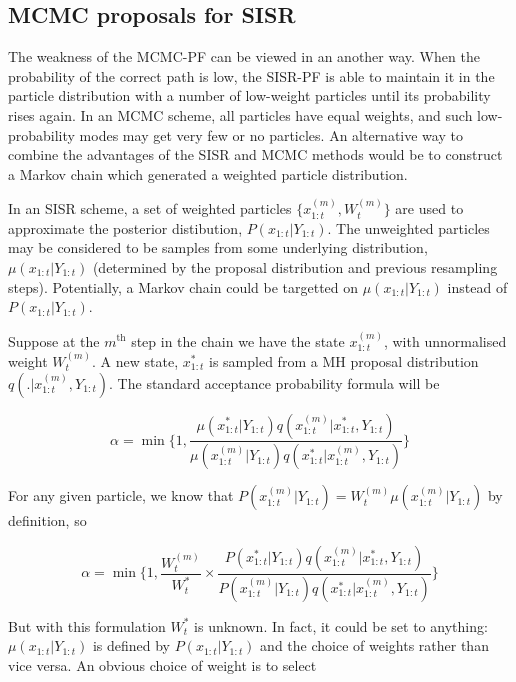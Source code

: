 \subsection{MCMC proposals for SISR}
The weakness of the MCMC-PF can be viewed in an another way. When the probability of the correct path is low, the SISR-PF is able to maintain it in the particle distribution with a number of low-weight particles until its probability rises again. In an MCMC scheme, all particles have equal weights, and such low-probability modes may get very few or no particles. An alternative way to combine the advantages of the SISR and MCMC methods would be to construct a Markov chain which generated a weighted particle distribution.

In an SISR scheme, a set of weighted particles $\{ x_{1:t}^{(m)}, W_t^{(m)} \}$ are used to approximate the posterior distibution, $P(x_{1:t}|Y_{1:t})$. The unweighted particles may be considered to be samples from some underlying distribution, $\mu(x_{1:t}|Y_{1:t})$ (determined by the proposal distribution and previous resampling steps). Potentially, a Markov chain could be targetted on $\mu(x_{1:t}|Y_{1:t})$ instead of $P(x_{1:t}|Y_{1:t})$.

Suppose at the $m^{\text{th}}$ step in the chain we have the state $x_{1:t}^{(m)}$, with unnormalised weight $W_t^{(m)}$. A new state, $x_{1:t}^{*}$ is sampled from a MH proposal distribution $q(.|x_{1:t}^{(m)}, Y_{1:t})$. The standard acceptance probability formula will be

\begin{equation}
\alpha = \min \bigg \{ 1, \frac{\mu(x_{1:t}^{*}|Y_{1:t})q(x_{1:t}^{(m)}|x_{1:t}^{*}, Y_{1:t})}{\mu(x_{1:t}^{(m)}|Y_{1:t})q(x_{1:t}^{*}|x_{1:t}^{(m)}, Y_{1:t})} \bigg \}
\end{equation}

For any given particle, we know that $P(x_{1:t}^{(m)}|Y_{1:t}) = W_t^{(m)} \mu(x_{1:t}^{(m)}|Y_{1:t})$ by definition, so

\begin{equation}
\alpha = \min \bigg \{ 1, \frac{W_t^{(m)}}{W_t^{*}} \times \frac{P(x_{1:t}^{*}|Y_{1:t})q(x_{1:t}^{(m)}|x_{1:t}^{*}, Y_{1:t})}{P(x_{1:t}^{(m)}|Y_{1:t})q(x_{1:t}^{*}|x_{1:t}^{(m)}, Y_{1:t})} \bigg \}
\end{equation}

But with this formulation $W_t^{*}$ is unknown. In fact, it could be set to anything: $\mu(x_{1:t}|Y_{1:t})$ is defined by $P(x_{1:t}|Y_{1:t})$ and the choice of weights rather than vice versa. An obvious choice of weight is to select

